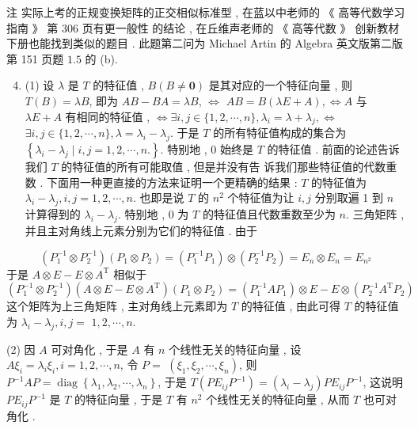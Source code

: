 \documentclass[10pt]{article}
\begin{document}
 注   实际上考的正规变换矩阵的正交相似标准型 ,  在蓝以中老师的 《 高等代数学习指南 》 第  306  页有更一般性   的结论 ,  在丘维声老师的 《 高等代数 》 创新教材下册也能找到类似的题目 .  此题第二问为  Michael Artin  的  Algebra  英文版第二版第  151  页题  $1.5$  的  (b).

\begin{enumerate}
  \setcounter{enumi}{3}
  \item (1)  设  $\lambda$  是  $T$  的特征值 , $B(B \neq \mathbf{0})$  是其对应的一个特征向量 ,  则  $T(B)=\lambda B$,  即为  $A B-B A=\lambda B$, $\Longleftrightarrow$ $A B=B(\lambda E+A), \Longleftrightarrow A$  与  $\lambda E+A$  有相同的特征值 , $\Longleftrightarrow \exists i, j \in\{1,2, \cdots, n\}, \lambda_{i}=\lambda+\lambda_{j}, \Longleftrightarrow$ $\exists i, j \in\{1,2, \cdots, n\}, \lambda=\lambda_{i}-\lambda_{j}$.  于是  $T$  的所有特征值构成的集合为  $\left\{\lambda_{i}-\lambda_{j} \mid i, j=1,2, \cdots, n .\right\}$.  特别地 , 0  始终是  $T$  的特征值 .  前面的论述告诉我们  $T$  的特征值的所有可能取值 ,  但是并没有告   诉我们那些特征值的代数重数 .  下面用一种更直接的方法来证明一个更精确的结果 : $T$  的特征值为  $\lambda_{i}-\lambda_{j}, i, j=1,2, \cdots, n$.  也即是说  $T$  的  $n^{2}$  个特征值为让  $i, j$  分别取遍  1  到  $n$  计算得到的  $\lambda_{i}-\lambda_{j}$.  特别地 , 0  为  $T$  的特征值且代数重数至少为  $n$.  三角矩阵 ,  并且主对角线上元素分别为它们的特征值 .  由于 
\end{enumerate}
$$
\left(P_{1}^{-1} \otimes P_{2}^{-1}\right)\left(P_{1} \otimes P_{2}\right)=\left(P_{1}^{-1} P_{1}\right) \otimes\left(P_{2}^{-1} P_{2}\right)=E_{n} \otimes E_{n}=E_{n^{2}}
$$
 于是  $A \otimes E-E \otimes A^{\mathrm{T}}$  相似于 
$$
\left(P_{1}^{-1} \otimes P_{2}^{-1}\right)\left(A \otimes E-E \otimes A^{\mathrm{T}}\right)\left(P_{1} \otimes P_{2}\right)=\left(P_{1}^{-1} A P_{1}\right) \otimes E-E \otimes\left(P_{2}^{-1} A^{\mathrm{T}} P_{2}\right)
$$
 这个矩阵为上三角矩阵 ,  主对角线上元素即为  $T$  的特征值 ,  由此可得  $T$  的特征值为  $\lambda_{i}-\lambda_{j}, i, j=$ $1,2, \cdots, n$.

(2)  因  $A$  可对角化 ,  于是  $A$  有  $n$  个线性无关的特征向量 ,  设  $A \xi_{i}=\lambda_{i} \xi_{i}, i=1,2, \cdots, n$,  令  $P=$ $\left(\xi_{1}, \xi_{2}, \cdots, \xi_{n}\right)$,  则  $P^{-1} A P=\operatorname{diag}\left\{\lambda_{1}, \lambda_{2}, \cdots, \lambda_{n}\right\}$,  于是  $T\left(P E_{i j} P^{-1}\right)=\left(\lambda_{i}-\lambda_{j}\right) P E_{i j} P^{-1}$,  这说明  $P E_{i j} P^{-1}$  是  $T$  的特征向量 ,  于是  $T$  有  $n^{2}$  个线性无关的特征向量 ,  从而  $T$  也可对角化 .
\end{document}
